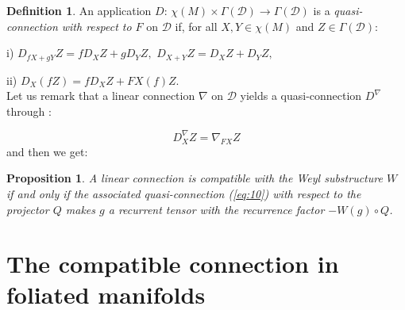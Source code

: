 \documentclass[11pt,oneside,english]{amsart}
\numberwithin{equation}{section}
\numberwithin{figure}{section}
\theoremstyle{plain}
\theoremstyle{definition}
\newtheorem{defn}[thm]{Definition}
\theoremstyle{definition}
\theoremstyle{plain}
\newtheorem{prop}[thm]{Proposition}
\theoremstyle{plain}
\theoremstyle{remark}
\theoremstyle{remark}
\begin{document}
\begin{defn}
An application $D:\,\chi(M)\times\Gamma(\mathcal{D})\rightarrow\Gamma(\mathcal{D})$
is a \emph{quasi-connection with respect to $F$} on $\mathcal{D}$
if, for all $X,Y\in\chi(M)$ and $Z\in\Gamma(\mathcal{D}):$

i) $D_{fX+gY}Z=fD_{X}Z+gD_{Y}Z,\,\, D_{X+Y}Z=D_{X}Z+D_{Y}Z,$

ii) $D_{X}(fZ)=fD_{X}Z+FX(f)Z.$\\

Let us remark that a linear connection $\nabla$ on $\mathcal{D}$
yields a quasi-connection $D^{\nabla}$ through \cite[p. 660]{s:h}:

\begin{equation}
D_{X}^{\nabla}Z=\nabla_{FX}Z\label{eq:10}\end{equation}
 and then we get:
\end{defn}
\begin{prop}
A linear connection is compatible with the Weyl substructure $W$
if and only if the associated quasi-connection (\ref{eq:10}) with
respect to the projector $Q$ makes $g$ a recurrent tensor with the
recurrence factor $-W(g)\circ Q$. 
\end{prop}
\medskip{}

\section{The compatible connection in foliated manifolds}
\end{document}
